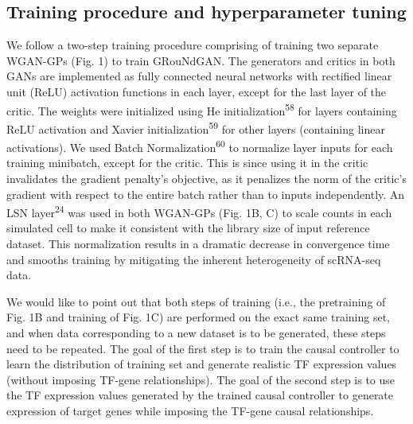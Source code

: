 \subsection*{Training procedure and hyperparameter tuning}

We follow a two-step training procedure comprising of training two separate WGAN-GPs (Fig. 1) to train GRouNdGAN. The generators and critics in both GANs are implemented as fully connected neural networks with rectified linear unit (ReLU) activation functions in each layer, except for the last layer of the critic. The weights were initialized using He initialization\textsuperscript{58} for layers containing ReLU activation and Xavier initialization\textsuperscript{59} for other layers (containing linear activations). We used Batch Normalization\textsuperscript{60} to normalize layer inputs for each training minibatch, except for the critic. This is since using it in the critic invalidates the gradient penalty’s objective, as it penalizes the norm of the critic’s gradient with respect to the entire batch rather than to inputs independently. An LSN layer\textsuperscript{24} was used in both WGAN-GPs (Fig. 1B, C) to scale counts in each simulated cell to make it consistent with the library size of input reference dataset. This normalization results in a dramatic decrease in convergence time and smooths training by mitigating the inherent heterogeneity of scRNA-seq data.

We would like to point out that both steps of training (i.e., the pretraining of Fig. 1B and training of Fig. 1C) are performed on the exact same training set, and when data corresponding to a new dataset is to be generated, these steps need to be repeated. The goal of the first step is to train the causal controller to learn the distribution of training set and generate realistic TF expression values (without imposing TF-gene relationships). The goal of the second step is to use the TF expression values generated by the trained causal controller to generate expression of target genes while imposing the TF-gene causal relationships.

